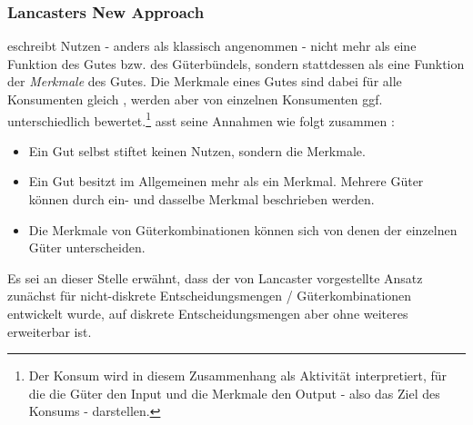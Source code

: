 % 
\subsubsection{Lancasters \glqq New Approach\grqq }
\label{_Ref364629843}
\label{_Toc366766079}
\label{_Toc366775273}
 \citeauthor{bib.680} eschreibt Nutzen - anders als klassisch angenommen - nicht mehr als eine Funktion des Gutes bzw. des Güterbündels, sondern stattdessen als eine Funktion der \emph{Merkmale} des Gutes. Die Merkmale eines Gutes sind dabei für alle Konsumenten gleich  \autocites[][]{bib.680}, werden aber von einzelnen Konsumenten ggf. unterschiedlich bewertet.\footnote{%
 Der Konsum wird in diesem Zusammenhang als Aktivität interpretiert, für die die Güter den Input und die Merkmale den Output - also das Ziel des Konsums - darstellen.
}%
  \citeauthor{bib.680} asst seine Annahmen wie folgt zusammen  \autocites[][]{bib.680}:~\\

\begin{itemize}
%
   \item Ein Gut selbst stiftet keinen Nutzen, sondern die Merkmale.
   \item Ein Gut besitzt im Allgemeinen mehr als ein Merkmal. Mehrere Güter können durch ein- und dasselbe Merkmal beschrieben werden.
   \item Die Merkmale von Güterkombinationen können sich von denen der einzelnen Güter unterscheiden.
%
\end{itemize}
Es sei an dieser Stelle erwähnt, dass der von Lancaster vorgestellte Ansatz zunächst für nicht-diskrete Entscheidungsmengen / Güterkombinationen entwickelt wurde, auf diskrete Entscheidungsmengen aber ohne weiteres erweiterbar ist.~\\


% 
